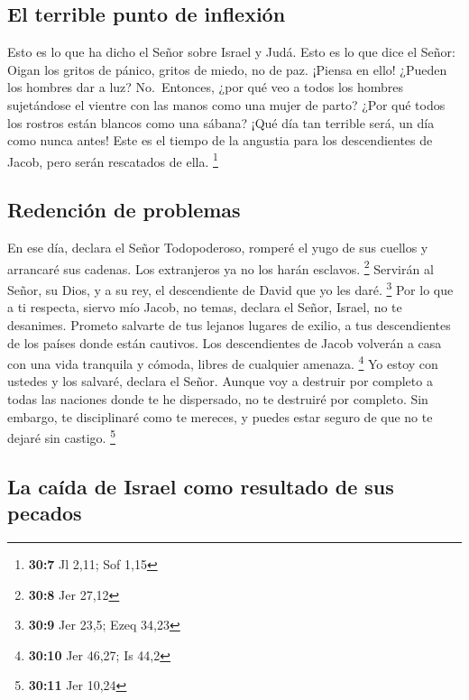 \hypertarget{el-terrible-punto-de-inflexiuxf3n}{%
\subsection{El terrible punto de
inflexión}\label{el-terrible-punto-de-inflexiuxf3n}}

 Esto es lo que ha dicho el Señor sobre Israel y Judá.
 Esto es lo que dice el Señor: Oigan los gritos de pánico,
gritos de miedo, no de paz.  ¡Piensa en ello! ¿Pueden los
hombres dar a luz? No.~Entonces, ¿por qué veo a todos los hombres
sujetándose el vientre con las manos como una mujer de parto? ¿Por qué
todos los rostros están blancos como una sábana?  ¡Qué día
tan terrible será, un día como nunca antes! Este es el tiempo de la
angustia para los descendientes de Jacob, pero serán rescatados de ella.
\footnote{\textbf{30:7} Jl 2,11; Sof 1,15}

\hypertarget{redenciuxf3n-de-problemas}{%
\subsection{Redención de problemas}\label{redenciuxf3n-de-problemas}}

 En ese día, declara el Señor Todopoderoso, romperé el
yugo de sus cuellos y arrancaré sus cadenas. Los extranjeros ya no los
harán esclavos. \footnote{\textbf{30:8} Jer 27,12} 
Servirán al Señor, su Dios, y a su rey, el descendiente de David que yo
les daré. \footnote{\textbf{30:9} Jer 23,5; Ezeq 34,23} 
Por lo que a ti respecta, siervo mío Jacob, no temas, declara el Señor,
Israel, no te desanimes. Prometo salvarte de tus lejanos lugares de
exilio, a tus descendientes de los países donde están cautivos. Los
descendientes de Jacob volverán a casa con una vida tranquila y cómoda,
libres de cualquier amenaza. \footnote{\textbf{30:10} Jer 46,27; Is 44,2}
 Yo estoy con ustedes y los salvaré, declara el Señor.
Aunque voy a destruir por completo a todas las naciones donde te he
dispersado, no te destruiré por completo. Sin embargo, te disciplinaré
como te mereces, y puedes estar seguro de que no te dejaré sin castigo.
\footnote{\textbf{30:11} Jer 10,24}

\hypertarget{la-cauxedda-de-israel-como-resultado-de-sus-pecados}{%
\subsection{La caída de Israel como resultado de sus
pecados}\label{la-cauxedda-de-israel-como-resultado-de-sus-pecados}}

